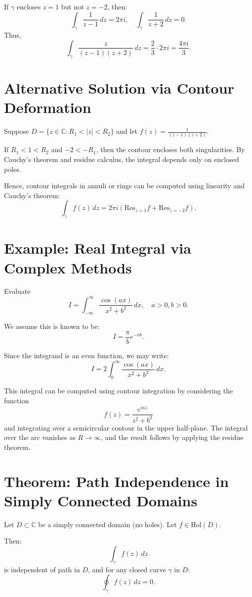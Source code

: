 \documentclass[12pt]{article}
\theoremstyle{definition} %
\theoremstyle{plain} %
\begin{document}
If $\gamma$ encloses $z = 1$ but not $z = -2$, then:
\[
\int_{\gamma} \frac{1}{z-1}\,dz = 2\pi i, \quad \int_{\gamma} \frac{1}{z+2}\,dz = 0.
\]
Thus,
\[
\int_{\gamma} \frac{z}{(z-1)(z+2)}\,dz = \frac{2}{3} \cdot 2\pi i = \frac{4\pi i}{3}.
\]

\section*{Alternative Solution via Contour Deformation}

Suppose $D = \{ z \in \mathbb{C} : R_1 < |z| < R_2 \}$ and let $f(z) = \frac{1}{(z - 1)(z + 2)}$.

If $R_1 < 1 < R_2$ and $-2 < -R_1$, then the contour encloses both singularities. By Cauchy’s theorem and residue calculus, the integral depends only on enclosed poles.

Hence, contour integrals in annuli or rings can be computed using linearity and Cauchy’s theorem:
\[
\int_{\gamma} f(z)\,dz = 2\pi i \left( \text{Res}_{z=1} f + \text{Res}_{z=-2} f \right).
\]
\section*{Example: Real Integral via Complex Methods}

Evaluate
\[
I = \int_{-\infty}^{\infty} \frac{\cos(ax)}{x^2 + b^2}\,dx, \quad a > 0, b > 0.
\]

We assume this is known to be:
\[
I = \frac{\pi}{b} e^{-ab}.
\]

Since the integrand is an even function, we may write:
\[
I = 2 \int_{0}^{\infty} \frac{\cos(ax)}{x^2 + b^2}\,dx.
\]

This integral can be computed using contour integration by considering the function
\[
f(z) = \frac{e^{iaz}}{z^2 + b^2}
\]
and integrating over a semicircular contour in the upper half-plane. The integral over the arc vanishes as $R \to \infty$, and the result follows by applying the residue theorem.

\section*{Theorem: Path Independence in Simply Connected Domains}

Let $D \subset \mathbb{C}$ be a simply connected domain (no holes). Let $f \in \text{Hol}(D)$.

Then:
\[
\int_{\gamma} f(z)\,dz
\]
is independent of path in $D$, and for any closed curve $\gamma$ in $D$:
\[
\oint_{\gamma} f(z)\,dz = 0.
\]
\end{document}
